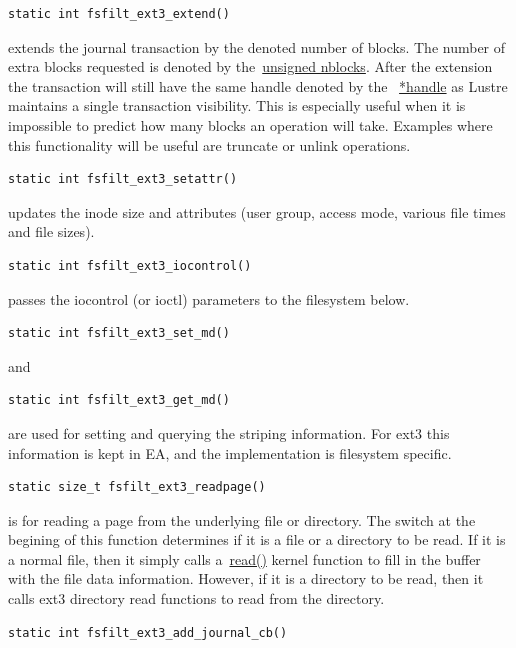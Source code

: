 \begin{Verbatim}
static int fsfilt_ext3_extend()
\end{Verbatim}

extends the journal transaction by the denoted number of blocks. The number of
extra blocks requested is denoted by the~\url{unsigned nblocks}. After the
extension the transaction will still have the same handle denoted by the
~\url{*handle} as Lustre maintains a single transaction visibility. This is
especially useful when it is impossible to predict how many blocks an operation
will take.  Examples where this functionality will be useful are truncate or
unlink operations. 

\begin{Verbatim}
static int fsfilt_ext3_setattr()
\end{Verbatim}

updates the inode size and attributes (user group, access mode, various file
times and file sizes). 

\begin{Verbatim}
static int fsfilt_ext3_iocontrol()
\end{Verbatim}

passes the iocontrol (or ioctl) parameters to the filesystem below.

\begin{Verbatim}
static int fsfilt_ext3_set_md() 
\end{Verbatim}

and

\begin{Verbatim}
static int fsfilt_ext3_get_md()
\end{Verbatim}


are used for setting and querying the striping information. For ext3 this
information is kept in EA, and the implementation is filesystem specific.

\begin{Verbatim}
static size_t fsfilt_ext3_readpage()
\end{Verbatim}

is for reading a page from the underlying file or directory. The switch at the
begining of this function determines if it is a file or a directory to be
read. If it is a normal file, then it simply calls a~\url{read()} kernel
function to fill in the buffer with the file data information. However, if it is a
directory to be read, then it calls ext3 directory read functions to read from
the directory. 

\begin{Verbatim}
static int fsfilt_ext3_add_journal_cb()
\end{Verbatim}

